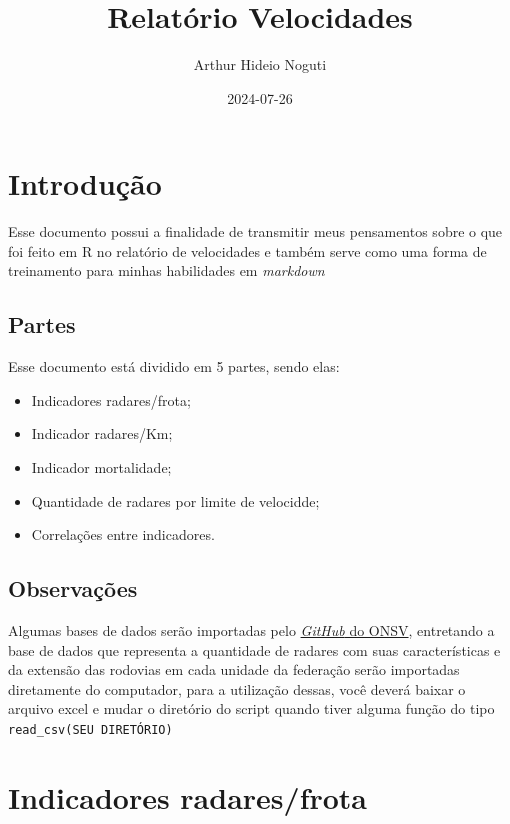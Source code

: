 \documentclass[
]{book}
\title{Relatório Velocidades}
\author{Arthur Hideio Noguti}
\date{2024-07-26}
\providecommand{\tightlist}{%
  \setlength{\itemsep}{0pt}\setlength{\parskip}{0pt}}
\begin{document}
\maketitle

{
\setcounter{tocdepth}{1}
\tableofcontents
}
\chapter{Introdução}\label{intro}

Esse documento possui a finalidade de transmitir meus pensamentos sobre o que foi feito em R no relatório de velocidades e também serve como uma forma de treinamento para minhas habilidades em \emph{markdown}

\section{Partes}\label{partes}

Esse documento está dividido em 5 partes, sendo elas:

\begin{itemize}
\tightlist
\item
  Indicadores radares/frota;\\
\item
  Indicador radares/Km;\\
\item
  Indicador mortalidade;\\
\item
  Quantidade de radares por limite de velocidde;\\
\item
  Correlações entre indicadores.
\end{itemize}

\section{Observações}\label{observauxe7uxf5es}

Algumas bases de dados serão importadas pelo \href{https://github.com/ONSV}{\emph{GitHub} do ONSV}, entretando a base de dados que representa a quantidade de radares com suas características e da extensão das rodovias em cada unidade da federação serão importadas diretamente do computador, para a utilização dessas, você deverá baixar o arquivo excel e mudar o diretório do script quando tiver alguma função do tipo \texttt{read\_csv(SEU\ DIRETÓRIO)}

\chapter{Indicadores radares/frota}\label{radar-frota}
\end{document}
